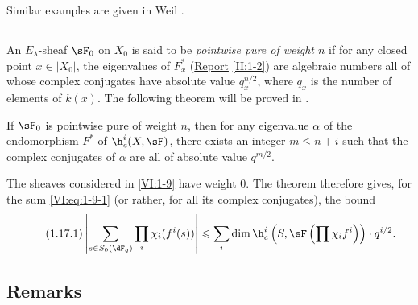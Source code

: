 Similar examples are given in Weil \cite[App V, 3rd ed.]{we74}. 





\subsection{}\label{VI:1-16}

An $E_\lambda$-sheaf $\sF_0$ on $X_0$ is said to be \emph{pointwise pure of 
weight $n$} if for any closed point $x\in |X_0|$, the eigenvalues of 
$F_x^\ast$ (\hyperref[II]{Report} \ref{II:1-2}) are algebraic numbers 
all of whose complex conjugates have absolute value 
$q_x^{n/2}$, where $q_x$ is the number of elements of $k(x)$. The 
following theorem will be proved in . 





\begin{theorem_}\label{VI:1-17}
If $\sF_0$ is pointwise pure of weight $n$, then for any eigenvalue $\alpha$ 
of the endomorphism $F^\ast$ of $\h_c^i(X,\sF)$, there exists an integer 
$m\leqslant n+i$ such that the complex conjugates of $\alpha$ are all of 
absolute value $q^{m/2}$.
\end{theorem_}

The sheaves considered in \ref{VI:1-9} have weight $0$. The theorem 
therefore gives, for the sum \ref{VI:eq:1-9-1} (or rather, for all its 
complex conjugates), the bound 
\begin{equation*}\tag{1.17.1}\label{VI:eq:1-17-1}
  \left|\sum_{s\in S_0(\dF_q)} \prod_i \chi_i(f^i(s)) \right| \leqslant \sum_i \dim \h_c^i\left(S,\sF\left(\prod \chi_i f^i\right)\right)\cdot q^{i/2} \text{.}
\end{equation*}





\subsection{Remarks}\label{VI:1-18}

